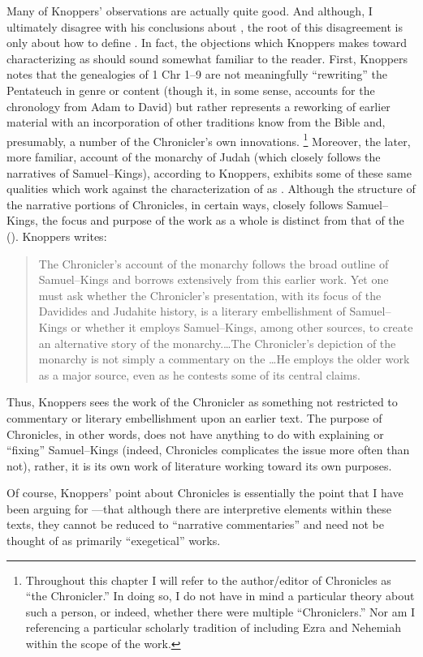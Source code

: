 Many of Knoppers' observations are actually quite good. And although, I ultimately disagree with his conclusions about \chronicles \visavis \rwb, the root of this disagreement is only about how to define \rwb. In fact, the objections which Knoppers makes toward characterizing \chronicles as \rwb should sound somewhat familiar to the reader. First, Knoppers notes that the genealogies of 1 Chr 1--9 are not meaningfully ``rewriting'' the Pentateuch in genre or content (though it, in some sense, accounts for the chronology from Adam to David) but rather represents a reworking of earlier material with an incorporation of other traditions know from the Bible and, presumably, a number of the Chronicler's own innovations.%
    \footnote{Throughout this chapter I will refer to the author/editor of Chronicles as ``the Chronicler.'' In doing so, I do not have in mind a particular theory about such a person, or indeed, whether there were multiple ``Chroniclers.'' Nor am I referencing a particular scholarly tradition of including Ezra and Nehemiah within the scope of the work.}
Moreover, the later, more familiar, account of the monarchy of Judah (which closely follows the narratives of Samuel--Kings), according to Knoppers, exhibits some of these same qualities which work against the characterization of \chronicles as \rwb. Although the structure of the narrative portions of Chronicles, in certain ways, closely follows Samuel--Kings, the focus and purpose of the work as a whole is distinct from that of the \DtrH (\dtrh). Knoppers writes:

\begin{quote}
    The Chronicler's account of the monarchy follows the broad outline of Samuel--Kings and borrows extensively from this earlier work. Yet one must ask whether the Chronicler's presentation, with its focus of the Davidides and Judahite history, is a literary embellishment of Samuel--Kings or whether it employs Samuel--Kings, among other sources, to create an alternative story of the monarchy.\dots The Chronicler's depiction of the monarchy is not simply a commentary on the \DtrH\dots He employs the older work as a major source, even as he contests some of its central claims.\autocite[132--33]{knoppers2003}
\end{quote}
\noindent
Thus, Knoppers sees the work of the Chronicler as something not restricted to commentary or literary embellishment upon an earlier text. The purpose of Chronicles, in other words, does not have anything to do with explaining or ``fixing'' Samuel--Kings (indeed, Chronicles complicates the issue more often than not), rather, it is its own work of literature working toward its own purposes.

Of course, Knoppers' point about Chronicles is essentially the point that I have been arguing for \visavis \rwb---that although there are interpretive elements within these texts, they cannot be reduced to ``narrative commentaries'' and need not be thought of as primarily ``exegetical'' works.


